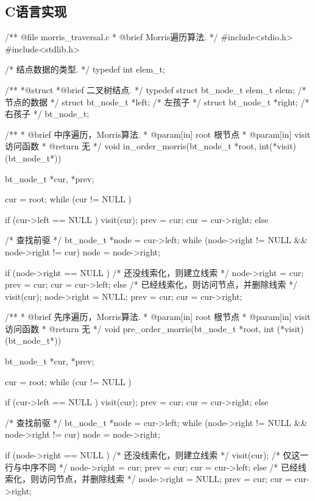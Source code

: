 \subsection{C语言实现}
\label{sec:morrisTraversalImpl}
\begin{Codex}[label=morris_traversal.c]
/** @file morris_traversal.c
 * @brief Morris遍历算法.
 */
#include<stdio.h>
#include<stdlib.h>

/* 结点数据的类型. */
typedef int elem_t;

/**
 *@struct
 *@brief 二叉树结点.
 */
typedef struct bt_node_t {
    elem_t elem; /* 节点的数据 */
    struct bt_node_t *left; /* 左孩子 */
    struct bt_node_t *right; /* 右孩子 */
} bt_node_t;

/**
 * @brief 中序遍历，Morris算法.
 * @param[in] root 根节点
 * @param[in] visit 访问函数
 * @return 无
 */
void in_order_morris(bt_node_t *root, int(*visit)(bt_node_t*)) {
    bt_node_t *cur, *prev;

    cur = root;
    while (cur != NULL ) {
        if (cur->left == NULL ) {
            visit(cur);
            prev = cur;
            cur = cur->right;
        } else {
            /* 查找前驱 */
            bt_node_t *node = cur->left;
            while (node->right != NULL && node->right != cur)
                node = node->right;

            if (node->right == NULL ) { /* 还没线索化，则建立线索 */
                node->right = cur;
                prev = cur;
                cur = cur->left;
            } else {    /* 已经线索化，则访问节点，并删除线索  */
                visit(cur);
                node->right = NULL;
                prev = cur;
                cur = cur->right;
            }
        }
    }
}

/**
 * @brief 先序遍历，Morris算法.
 * @param[in] root 根节点
 * @param[in] visit 访问函数
 * @return 无
 */
void pre_order_morris(bt_node_t *root, int (*visit)(bt_node_t*)) {
    bt_node_t *cur, *prev;

    cur = root;
    while (cur != NULL ) {
        if (cur->left == NULL ) {
            visit(cur);
            prev = cur;
            cur = cur->right;
        } else {
            /* 查找前驱 */
            bt_node_t *node = cur->left;
            while (node->right != NULL && node->right != cur)
                node = node->right;

            if (node->right == NULL ) { /* 还没线索化，则建立线索 */
                visit(cur); /* 仅这一行与中序不同 */
                node->right = cur;
                prev = cur;
                cur = cur->left;
            } else {    /* 已经线索化，则访问节点，并删除线索  */
                node->right = NULL;
                prev = cur;
                cur = cur->right;
            }
        }
    }
}



\end{Codex}
